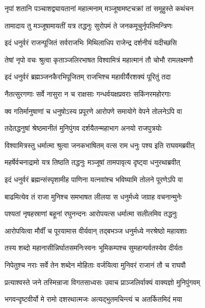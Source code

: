 \twolineshloka
{नृपां शतानि पञ्चाशद्व्यायतानां महात्मनाम्}
{मञ्जूषामष्टचक्रां तां समूहुस्ते कथंचन} %

\twolineshloka
{तामादाय तु मञ्जूषामायतीं यत्र तद्धनुः}
{सुरोपमं ते जनकमूचुर्नृपतिमन्त्रिणः} %

\twolineshloka
{इदं धनुर्वरं राजन्पूजितं सर्वराजभिः}
{मिथिलाधिप राजेन्द्र दर्शनीयं यदीच्छसि} %

\twolineshloka
{तेषां नृपो वचः श्रुत्वा कृताञ्जलिरभाषत}
{विश्वामित्रं महात्मानं तौ चोभौ रामलक्ष्मणौ} %

\twolineshloka
{इदं धनुर्वरं ब्रह्मञ्जनकैरभिपूजितम्}
{राजभिश्च महावीर्यैरशक्यं पूरितुं तदा} %

\twolineshloka
{नैतत्सुरगणाः सर्वे नासुरा न च राक्षसाः}
{गन्धर्वयक्षप्रवराः सकिंनरमहोरगाः} %

\twolineshloka
{क्व गतिर्मानुषाणां च धनुषोऽस्य प्रपूरणे}
{आरोपणे समायोगे वेपने तोलनेऽपि वा} %

\twolineshloka
{तदेतद्धनुषां श्रेष्ठमानीतं मुनिपुंगव}
{दर्शयैतन्महाभाग अनयो राजपुत्रयोः} %

\twolineshloka
{विश्वामित्रस्तु धर्मात्मा श्रुत्वा जनकभाषितम्}
{वत्स राम धनुः पश्य इति राघवमब्रवीत्} %

\twolineshloka
{महर्षेर्वचनाद्रामो यत्र तिष्ठति तद्धनुः}
{मञ्जूषां तामपावृत्य दृष्ट्वा धनुरथाब्रवीत्} %

\twolineshloka
{इदं धनुर्वरं ब्रह्मन्संस्पृशामीह पाणिना}
{यत्नवांश्च भविष्यामि तोलने पूरणेऽपि वा} %

\twolineshloka
{बाढमित्येव तं राजा मुनिश्च समभाषत}
{लीलया स धनुर्मध्ये जग्राह वचनान्मुनेः} %

\twolineshloka
{पश्यतां नृषहस्राणां बहूनां रघुनन्दनः}
{आरोपयत्स धर्मात्मा सलीलमिव तद्धनुः} %

\twolineshloka
{आरोपयित्वा मौर्वीं च पूरयामास वीर्यवान्}
{तद्बभञ्ज धनुर्मध्ये नरश्रेष्ठो महायशाः} %

\twolineshloka
{तस्य शब्दो महानासीन्निर्घातसमनिःस्वनः}
{भूमिकम्पश्च सुमहान्पर्वतस्येव दीर्यतः} %

\twolineshloka
{निपेतुश्च नराः सर्वे तेन शब्देन मोहिताः}
{वर्जयित्वा मुनिवरं राजानं तौ च राघवौ} %

\twolineshloka
{प्रत्याश्वस्ते जने तस्मिन्राजा विगतसाध्वसः}
{उवाच प्राञ्जलिर्वाक्यं वाक्यज्ञो मुनिपुंगवम्} %

\twolineshloka
{भगवन्दृष्टवीर्यो मे रामो दशरथात्मजः}
{अत्यद्भुतमचिन्त्यं च अतर्कितमिदं मया} %

